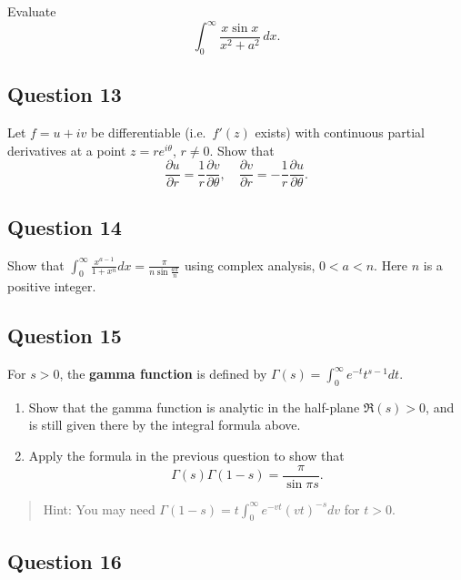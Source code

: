 \documentclass[12pt]{article}
\begin{document}
Evaluate \[\displaystyle{ \int_{0}^{\infty}\frac{x\sin x}{x^2+a^2} \,
dx }.\]

\hypertarget{question-13-2}{%
\subsection{Question 13}\label{question-13-2}}

Let \(f=u+iv\) be differentiable (i.e.~\(f'(z)\) exists) with continuous
partial derivatives at a point \(z=re^{i\theta}\), \(r\not= 0\). Show
that
\[\frac{\partial u}{\partial r}=\frac{1}{r}\frac{\partial v}{\partial \theta},\quad
\frac{\partial v}{\partial r}=-\frac{1}{r}\frac{\partial u}{\partial \theta}.\]

\hypertarget{question-14-2}{%
\subsection{Question 14}\label{question-14-2}}

Show that
\(\displaystyle \int_0^\infty \frac{x^{a-1}}{1+x^n} dx=\frac{\pi}{n\sin \frac{a\pi}{n}}\)
using complex analysis, \(0< a < n\). Here \(n\) is a positive integer.

\hypertarget{question-15-2}{%
\subsection{Question 15}\label{question-15-2}}

For \(s>0\), the \textbf{gamma function} is defined by
\(\displaystyle{\Gamma(s)=\int_0^{\infty} e^{-t}t^{s-1} dt}\).

\begin{enumerate}
\def\labelenumi{\arabic{enumi}.}
\item
  Show that the gamma function is analytic in the half-plane
  \(\Re (s)>0\), and is still given there by the integral formula above.
\item
  Apply the formula in the previous question to show that
  \[\Gamma(s)\Gamma(1-s)=\frac{\pi}{\sin \pi s}.\]
\end{enumerate}

\begin{quote}
Hint: You may need
\(\displaystyle{\Gamma(1-s)=t \int_0^{\infty}e^{-vt}(vt)^{-s} dv}\) for
\(t>0\).
\end{quote}

\hypertarget{question-16-2}{%
\subsection{Question 16}\label{question-16-2}}
\end{document}
